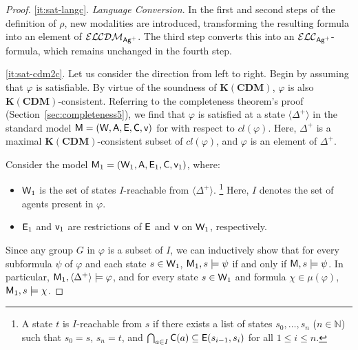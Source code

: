 \documentclass{article}
\newcommand{\ag}{\text{\normalfont\textsf{Ag}}\xspace}
\newcommand{\CA}{\textnormal{\sf A}\xspace}
\newcommand{\CC}{\textnormal{\sf C}\xspace}
\newcommand{\CE}{\textnormal{\sf E}\xspace}
\newcommand{\CM}{\textnormal{\sf M}\xspace}
\newcommand{\CV}{\textnormal{\sf v}\xspace}
\newcommand{\CW}{\textnormal{\sf W}\xspace}
\renewcommand{\phi}{\varphi}
\newcommand{\mbN}{\mathbb{N}}
\newcommand{\langc}{\ensuremath{\mathcal{ELC}}\xspace}
\newcommand{\langcdm}{\ensuremath{\mathcal{ELCDM}}\xspace}
\newcommand{\lcdm}{\text{\normalfont ELCDM}\xspace}
\newcommand{\KCDM}{\ensuremath{\mathbf{K(CDM)}}\xspace}
\begin{document}
\begin{proof}
\ref{it:sat-langc}. \textit{Language Conversion}. In the first and second steps of the definition of $\rho$, new modalities are introduced, transforming the resulting formula into an element of $\langcdm_{\ag^+}$. The third step converts this into an $\langc_{\ag^+}$-formula, which remains unchanged in the fourth step.

\ref{it:sat-cdm2c}. Let us consider the direction from left to right. Begin by assuming that $\phi$ is satisfiable. By virtue of the soundness of \KCDM, $\phi$ is also \KCDM-consistent. Referring to the completeness theorem's proof (Section~\ref{sec:completeness5}), we find that $\phi$ is satisfied at a state $\langle \Delta^+\rangle$ in the standard model $\CM=(\CW,\CA,\CE,\CC,\CV)$ for \lcdm with respect to $cl(\phi)$. Here, $\Delta^+$ is a maximal $\KCDM$-consistent subset of $cl(\phi)$, and $\phi$ is an element of $\Delta^+$.

Consider the model $\CM_1=(\CW_1,\CA,\CE_1,\CC,\CV_1)$, where: 
\begin{itemize}
\item $\CW_1$ is the set of states $I$-reachable from $\langle \Delta^+ \rangle$.%
\footnote{A state $t$ is $I$-reachable from $s$ if there exists a list of states $s_0, \dots, s_n$ ($n \in \mbN$) such that $s_0=s$, $s_n=t$, and $\bigcap_{ a \in I }\CC(a) \subseteq \CE(s_{i-1}, s_i)$ for all $1 \leq i \leq n$.}
Here, $I$ denotes the set of agents present in $\phi$.

\item $\CE_1$ and $\CV_1$ are restrictions of $\CE$ and $\CV$ on $\CW_1$, respectively.
\end{itemize}
Since any group $G$ in $\phi$ is a subset of $I$, we can inductively show that for every subformula $\psi$ of $\phi$ and each state $s \in \CW_1$, $\CM_1,s\models\psi$ if and only if $\CM,s\models\psi$. In particular, $\CM_1,\langle \Delta^+\rangle\models\phi$, and for every state $s\in\CW_1$ and formula $\chi\in\mu(\phi)$, $\CM_1,s\models\chi$.


\end{proof}
\end{document}
